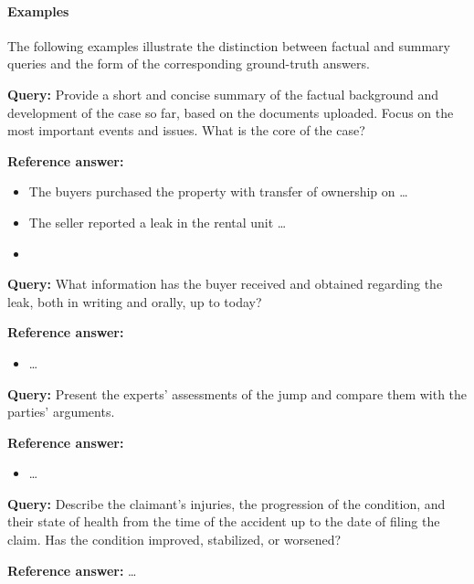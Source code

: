 \paragraph{Examples}

The following examples illustrate the distinction between factual and summary queries and the form of the corresponding ground-truth answers.

\begin{tcolorbox}[examplebox, title={Summary query --- THRD-2021-163881, Session 1}]
\textbf{Query:} Provide a short and concise summary of the factual background and development of the case so far, based on the documents uploaded. Focus on the most important events and issues. What is the core of the case?

\medskip
\textbf{Reference answer:}
\begin{itemize}[noitemsep, topsep=2pt]
  \item The buyers purchased the property with transfer of ownership on \dots
  \item The seller reported a leak in the rental unit \dots
  \item[$\vdots$]
\end{itemize}
\end{tcolorbox}

\begin{tcolorbox}[examplebox, title={Factual query --- THRD-2021-163881, Session 1}]
\textbf{Query:} What information has the buyer received and obtained regarding the leak, both in writing and orally, up to today?

\medskip
\textbf{Reference answer:}
\begin{itemize}[noitemsep, topsep=2pt]
  \item \dots
\end{itemize}
\end{tcolorbox}

\begin{tcolorbox}[examplebox, title={Factual query --- TOSL-2024-125319, Session 3}]
\textbf{Query:} Present the experts’ assessments of the jump and compare them with the parties’ arguments.

\medskip
\textbf{Reference answer:}
\begin{itemize}[noitemsep, topsep=2pt]
  \item \dots
\end{itemize}
\end{tcolorbox}

\begin{tcolorbox}[examplebox, title={Summary query --- TOSL-2024-125319, Session 3}]
\textbf{Query:} Describe the claimant’s injuries, the progression of the condition, and their state of health from the time of the accident up to the date of filing the claim. Has the condition improved, stabilized, or worsened?

\medskip
\textbf{Reference answer:} \dots
\end{tcolorbox}

